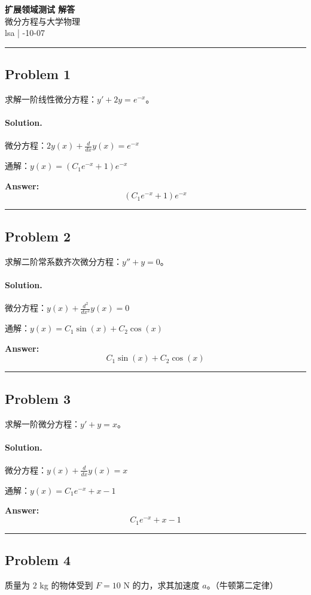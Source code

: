 \documentclass[12pt, a4paper]{ctexart}
\newcommand{\problem}[1]{\subsection*{Problem #1}}
\newcommand{\solution}{\paragraph{Solution.}}
\begin{document}
\begin{center}
    {\LARGE\bfseries 扩展领域测试 解答} \\[0.5em]
    {\large 微分方程与大学物理} \\[0.3em]
    lsa \quad | -10-07
\end{center}

\hrule
\vspace{1em}
\problem{1}

求解一阶线性微分方程：$y' + 2y = e^{-x}$。

\solution

微分方程：$2 y{\left(x \right)} + \frac{d}{d x} y{\left(x \right)} = e^{- x}$

通解：$y{\left(x \right)} = \left(C_{1} e^{- x} + 1\right) e^{- x}$

\textbf{Answer:}
\[\boxed{\left(C_{1} e^{- x} + 1\right) e^{- x}}\]

\vspace{1em}
\hrule
\vspace{1em}

\problem{2}

求解二阶常系数齐次微分方程：$y'' + y = 0$。

\solution

微分方程：$y{\left(x \right)} + \frac{d^{2}}{d x^{2}} y{\left(x \right)} = 0$

通解：$y{\left(x \right)} = C_{1} \sin{\left(x \right)} + C_{2} \cos{\left(x \right)}$

\textbf{Answer:}
\[\boxed{C_{1} \sin{\left(x \right)} + C_{2} \cos{\left(x \right)}}\]

\vspace{1em}
\hrule
\vspace{1em}

\problem{3}

求解一阶微分方程：$y' + y = x$。

\solution

微分方程：$y{\left(x \right)} + \frac{d}{d x} y{\left(x \right)} = x$

通解：$y{\left(x \right)} = C_{1} e^{- x} + x - 1$

\textbf{Answer:}
\[\boxed{C_{1} e^{- x} + x - 1}\]

\vspace{1em}
\hrule
\vspace{1em}

\problem{4}

质量为 $2$ kg 的物体受到 $F = 10$ N 的力，求其加速度 $a$。（牛顿第二定律）
\end{document}
